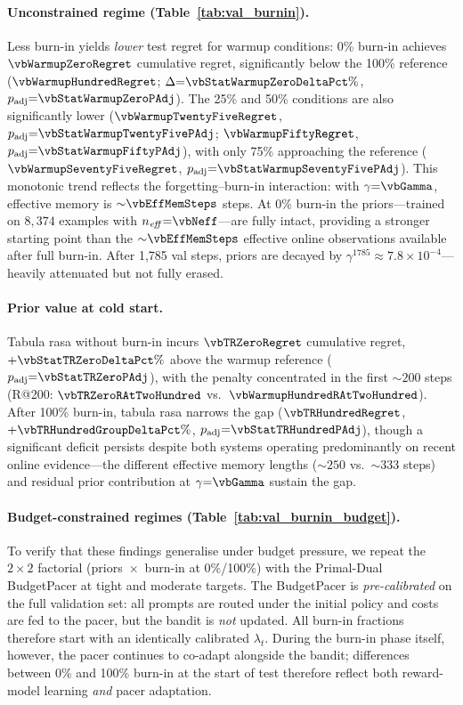 \paragraph{Unconstrained regime (Table~\ref{tab:val_burnin}).}
Less burn-in yields \emph{lower} test regret for warmup conditions:
0\% burn-in achieves $\vbWarmupZeroRegret$ cumulative regret, significantly below the
100\% reference ($\vbWarmupHundredRegret$; $\Delta{=}\vbStatWarmupZeroDeltaPct\%$,
$p_\mathrm{adj}{=}\vbStatWarmupZeroPAdj$).  The 25\% and 50\% conditions
are also significantly lower ($\vbWarmupTwentyFiveRegret$, $p_\mathrm{adj}{=}\vbStatWarmupTwentyFivePAdj$;
$\vbWarmupFiftyRegret$, $p_\mathrm{adj}{=}\vbStatWarmupFiftyPAdj$), with only 75\% approaching the
reference ($\vbWarmupSeventyFiveRegret$, $p_\mathrm{adj}{=}\vbStatWarmupSeventyFivePAdj$).  This monotonic trend
reflects the forgetting--burn-in interaction: with $\gamma{=}\vbGamma$,
effective memory is ${\sim}\vbEffMemSteps$ steps.  At 0\% burn-in the
priors---trained on $8{,}374$ examples with
$n_\mathit{eff}{=}\vbNeff$---are fully intact, providing a stronger
starting point than the ${\sim}\vbEffMemSteps$ effective online observations
available after full burn-in.
After 1{,}785 val steps, priors are decayed by $\gamma^{1785} \approx
7.8{\times}10^{-4}$---heavily attenuated but not fully erased.

\paragraph{Prior value at cold start.}
Tabula rasa without burn-in incurs $\vbTRZeroRegret$ cumulative regret, $+\vbStatTRZeroDeltaPct\%$
above the warmup reference ($p_\mathrm{adj}{=}\vbStatTRZeroPAdj$), with the
penalty concentrated in the first ${\sim}200$ steps (R@200: $\vbTRZeroRAtTwoHundred$
vs.\ $\vbWarmupHundredRAtTwoHundred$).  After 100\% burn-in, tabula rasa narrows the gap
($\vbTRHundredRegret$, $+\vbTRHundredGroupDeltaPct\%$,
$p_\mathrm{adj}{=}\vbStatTRHundredPAdj$), though a significant
deficit persists despite both systems operating predominantly on
recent online evidence---the different effective memory lengths
(${\sim}250$ vs.\ ${\sim}333$ steps) and residual prior contribution
at $\gamma{=}\vbGamma$ sustain the gap.

\paragraph{Budget-constrained regimes (Table~\ref{tab:val_burnin_budget}).}
To verify that these findings generalise under budget pressure, we
repeat the $2{\times}2$ factorial (priors~$\times$~burn-in at
0\%/100\%) with the Primal-Dual BudgetPacer at tight and moderate
targets.  The BudgetPacer is \emph{pre-calibrated} on the full
validation set: all prompts are routed under the initial policy and
costs are fed to the pacer, but the bandit is \emph{not} updated.  All
burn-in fractions therefore start with an identically calibrated
$\lambda_t$.  During the burn-in phase itself, however, the pacer
continues to co-adapt alongside the bandit; differences between 0\%
and 100\% burn-in at the start of test therefore reflect both
reward-model learning \emph{and} pacer adaptation.

